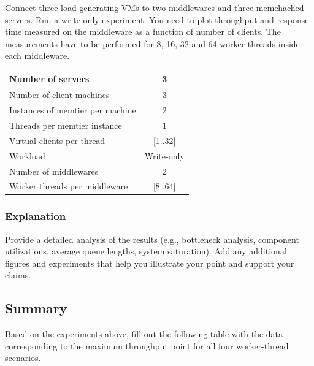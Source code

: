 \documentclass[11pt,a4paper]{article}
\begin{document}
Connect three load generating VMs to two middlewares and three memchached servers. Run a write-only experiment. 
You need to plot throughput and response time measured on the middleware as a function of number of clients. The measurements have to be performed for 8, 16, 32 and 64 worker threads inside each middleware.

\begin{center}
	\scriptsize{
		\begin{tabular}{|l|c|}
			\hline Number of servers                & 3          \\ 
			\hline Number of client machines        & 3          \\ 
			\hline Instances of memtier per machine & 2          \\ 
			\hline Threads per memtier instance     & 1          \\
			\hline Virtual clients per thread       & [1..32]    \\ 
			\hline Workload                         & Write-only \\
			\hline Number of middlewares            & 2          \\
			\hline Worker threads per middleware    & [8..64]    \\
			\hline 
		\end{tabular}
	} 
\end{center}

\subsubsection{Explanation}

Provide a detailed analysis of the results (e.g., bottleneck analysis, component utilizations, average queue lengths, system saturation). Add any additional figures and experiments that help you illustrate your point and support your claims.

\subsection{Summary}

Based on the experiments above, fill out the following table with the data corresponding to the maximum throughput point for all four worker-thread scenarios.
\end{document}
